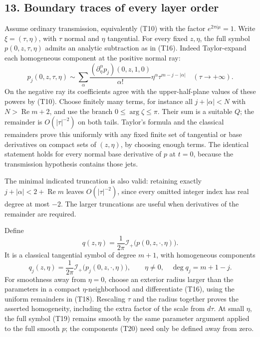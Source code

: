 \documentclass[
  11pt,
]{article}
\begin{document}
\subsection{13. Boundary traces of every layer
order}\label{boundary-traces-of-every-layer-order}

Assume ordinary transmission, equivalently (T10) with the factor
\(e^{2\pi i\mu}=1\). Write \(\xi=(\tau,\eta)\), with \(\tau\) normal and
\(\eta\) tangential. For every fixed \(z,\eta\), the full symbol
\(p(0,z,\tau,\eta)\) admits an analytic subtraction as in (T16). Indeed
Taylor-expand each homogeneous component at the positive normal ray: \[
p_j(0,z,\tau,\eta)\sim
\sum_\alpha \frac{(\partial_\eta^\alpha p_j)(0,z,1,0)}{\alpha!}
\eta^\alpha\tau^{m-j-|\alpha|}\quad(\tau\to+\infty).
\tag{T18}
\] On the negative ray its coefficients agree with the upper-half-plane
values of these powers by (T10). Choose finitely many terms, for
instance all \(j+|\alpha|<N\) with \(N>\operatorname{Re}m+2\), and use
the branch \(0\leq\arg\zeta\leq\pi\). Their sum is a suitable \(Q\); the
remainder is \(O(|\tau|^{-2})\) on both tails. Taylor's formula and the
classical remainders prove this uniformly with any fixed finite set of
tangential or base derivatives on compact sets of \((z,\eta)\), by
choosing enough terms. The identical statement holds for every normal
base derivative of \(p\) at \(t=0\), because the transmission hypothesis
contains those jets.

The minimal indicated truncation is also valid: retaining exactly
\(j+|\alpha|<2+\operatorname{Re}m\) leaves \(O(|\tau|^{-2})\), since
every omitted integer index has real degree at most \(-2\). The larger
truncations are useful when derivatives of the remainder are required.

Define \[
q(z,\eta)=\frac1{2\pi}\mathcal I_+\big(p(0,z,\cdot,\eta)\big).
\tag{T19}
\] It is a classical tangential symbol of degree \(m+1\), with
homogeneous components \[
q_j(z,\eta)=\frac1{2\pi}\mathcal I_+\big(p_j(0,z,\cdot,\eta)\big),
\qquad \eta\ne0,
\quad \deg q_j=m+1-j.
\tag{T20}
\] For smoothness away from \(\eta=0\), choose an exterior radius larger
than the parameters in a compact \(\eta\)-neighborhood and differentiate
(T16), using the uniform remainders in (T18). Rescaling \(\tau\) and the
radius together proves the asserted homogeneity, including the extra
factor of the scale from \(d\tau\). At small \(\eta\), the full symbol
(T19) remains smooth by the same parameter argument applied to the full
smooth \(p\); the components (T20) need only be defined away from zero.
\end{document}
